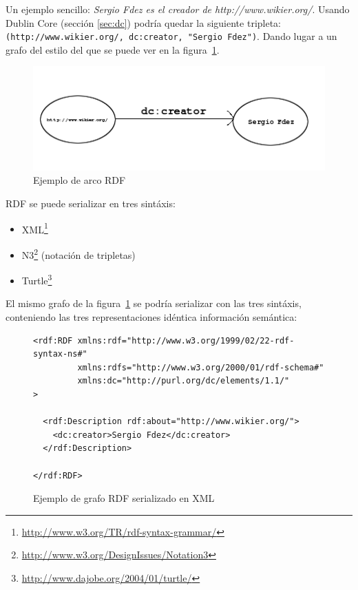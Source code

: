 Un ejemplo sencillo: \textit{Sergio Fdez es el creador de http://www.wikier.org/}. 
Usando Dublin Core (sección \ref{sec:dc}) podría quedar la siguiente tripleta: 
\texttt{(http://www.wikier.org/, dc:creator, "Sergio Fdez")}. Dando lugar a un 
grafo del estilo del que se puede ver en la figura~\ref{fig:rdfTripletExample}.

\begin{figure}[H]
	\centering
	\includegraphics[width=12cm]{images/arc-example.png}
	\caption{Ejemplo de arco RDF}
	\label{fig:rdfTripletExample}
\end{figure}


RDF se puede serializar en tres sintáxis: 

\begin{itemize}
 \item XML\footnote{\url{http://www.w3.org/TR/rdf-syntax-grammar/}}
 \item N3\footnote{\url{http://www.w3.org/DesignIssues/Notation3}} (notación de tripletas)
 \item Turtle\footnote{\url{http://www.dajobe.org/2004/01/turtle/}}
\end{itemize}

El mismo grafo de la figura~\ref{fig:rdfTripletExample} se podría serializar 
con las tres sintáxis, conteniendo las tres representaciones idéntica información 
semántica:

\begin{figure}[H]
\lstset{language=RDF}
\begin{lstlisting}
<rdf:RDF xmlns:rdf="http://www.w3.org/1999/02/22-rdf-syntax-ns#"
         xmlns:rdfs="http://www.w3.org/2000/01/rdf-schema#"
         xmlns:dc="http://purl.org/dc/elements/1.1/"
>

  <rdf:Description rdf:about="http://www.wikier.org/">
    <dc:creator>Sergio Fdez</dc:creator>
  </rdf:Description>

</rdf:RDF>
\end{lstlisting}
\caption{Ejemplo de grafo RDF serializado en XML}
\label{fig:ejemplo.rdfxml}
\end{figure}

